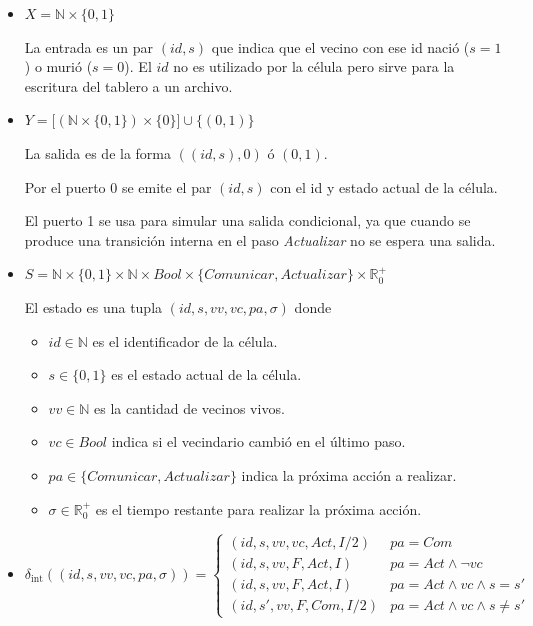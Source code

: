 \documentclass[12pt]{article}
\newcommand{\dint}{\delta_{\text{int}}}
\newcommand{\estado}{(id, s, vv, vc, pa, \sigma)}
\newcommand{\R}{\mathbb{R}}
\newcommand{\N}{\mathbb{N}}
\begin{document}
\begin{itemize}
  \item $X = \N \times \{0,1\}$

    La entrada es un par $(id, s)$ que indica que el vecino con ese id nació ($s=1$) o murió ($s=0$). El $id$ no es utilizado por la célula pero sirve para la escritura del tablero a un archivo.

  \item $Y = \big[ (\N \times \{0,1\}) \times \{0\} \big] \cup \{(0, 1)\}$

    La salida es de la forma $((id, s), 0)$ ó $(0, 1)$.

    Por el puerto 0 se emite el par $(id, s)$ con el id y estado actual de la célula.

    El puerto 1 se usa para simular una salida condicional, ya que cuando se produce una transición interna en el paso \textit{Actualizar} no se espera una salida.

  \item $S = \N \times \{0, 1\} \times \N \times Bool \times \{Comunicar, Actualizar\} \times \R_0^+$

    El estado es una tupla $(id, s, vv, vc, pa, \sigma)$ donde

    \begin{itemize}
      \item $id \in \N$ es el identificador de la célula.
      \item $s \in \{0, 1\}$ es el estado actual de la célula.
      \item $vv \in \N$ es la cantidad de vecinos vivos.
      \item $vc \in Bool$ indica si el vecindario cambió en el último paso.
      \item $pa \in \{Comunicar, Actualizar\}$ indica la próxima acción a realizar.
      \item $\sigma \in \R_0^+$ es el tiempo restante para realizar la próxima acción.
    \end{itemize}

  \item $\dint(\estado) = \begin{cases}
      (id, s, vv, vc, Act, I/2) & pa = Com \\
      (id, s, vv, F, Act, I) & pa = Act \land \lnot vc \\
      (id, s, vv, F, Act, I) & pa = Act \land vc \land s = s' \\
      (id, s', vv, F, Com, I/2) & pa = Act \land vc \land s \neq s'
    \end{cases}$


\end{itemize}
\end{document}
